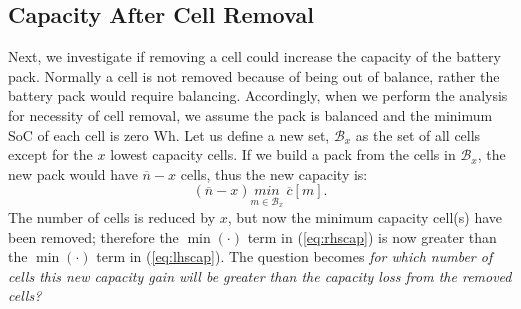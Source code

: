 \documentclass[10pt,twocolumn]{IEEEtran}
\begin{document}
%
%
%

\subsection{Capacity After Cell Removal }
Next, we investigate  if removing a cell could increase the capacity of the battery pack.
Normally  a cell is not removed because of being out of balance,  rather the battery  pack would require  balancing.
Accordingly,  when we perform the  analysis for necessity of cell removal, we assume the pack is balanced and the minimum SoC of each cell is zero Wh.
Let us define a new set, $\mathcal{B}_x$ as the set of all cells except for the $x$ lowest capacity cells.
If we build a pack from the cells in  $\mathcal{B}_x$, the new pack would have $\overline{n} - x$ cells, thus the new capacity is:
%
\begin{equation}
\label{eq:rhscap}
(\overline{n}-x) \underset{m\in \mathcal{B}_x}{min} \ \overline c[m].
\end{equation}
%
The number of cells is reduced by $x$, but now the minimum capacity cell(s) have been removed; therefore the $\min(\cdot)$ term in (\ref{eq:rhscap}) is now greater than the $\min(\cdot)$ term in (\ref{eq:lhscap}).
 The question   becomes \emph{ for which number of cells  this new capacity gain will be greater than the capacity loss from the removed cells? }
\end{document}

